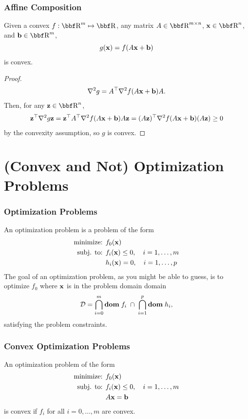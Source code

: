 \documentclass{beamer}
\begin{document}
\begin{frame}
    \frametitle{Affine Composition}
    \begin{theorem}
        Given a convex $f : \RR^m \mapsto \RR$, any matrix $A\in\RR^{m \times n}$, $\xx\in\RR^n$,
        and $\bb\in\RR^m$,
        \[
            g({\bf x}) = f(A{\bf x} + {\bf b})
        \]
        is convex.
    \end{theorem}
    \begin{proof}
        \[
            \nabla^2g = A^\top \nabla^2 f(A{\bf x} + {\bf b}) A.
        \]
        Then, for any $\zz\in\RR^n$,
        \[
            {\bf z}^\top \nabla^2g {\bf z} = {\bf z}^\top A^\top \nabla^2 f(A{\bf x} + {\bf b}) A {\bf z} = (A{\bf z})^\top\nabla^2 f(A{\bf x} + {\bf b}) (A {\bf z}) \geq 0
        \]
        by the convexity assumption, so $g$ is convex.
    \end{proof}
\end{frame}

\section{(Convex and Not) Optimization Problems}
\begin{frame}
    \frametitle{Optimization Problems}
    An optimization problem is a problem of the form
    \begin{align*}
        \text{minimize: } & f_0({\bf x})\\
        \text{subj. to: } & f_i({\bf x}) \leq 0, \quad i=1,\dots,m\\
                          & h_i({\bf x}) = 0, \quad i=1,\dots,p
    \end{align*}
    The goal of an optimization problem, as you might be able to guess, is to optimize $f_0$
    where ${\bf x}$ is in the problem domain domain 
    \[
        {\cal D} = \bigcap_{i=0}^m\mathbf{dom}\; f_i \;\cap\; \bigcap_{i=1}^p \mathbf{dom}\; h_i,
    \]
    satisfying the problem constraints.
\end{frame}

\begin{frame}
    \frametitle{Convex Optimization Problems}
    An optimization problem of the form
    \begin{align*}
        \text{minimize: } & f_0({\bf x})\\
        \text{subj. to: } & f_i({\bf x}) \leq 0, \quad i=1,\dots,m\\
                          & A{\bf x} = {\bf b}
    \end{align*}
    is convex if $f_i$ for all $i = 0,\dots,m$ are convex.
\end{frame}
\end{document}
